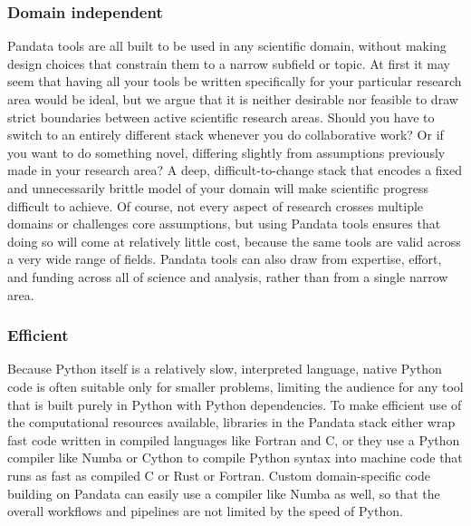 \subsubsection{Domain independent}
Pandata tools are all built to be used in any scientific domain, without making design choices that constrain them to a narrow subfield or topic. At first it may seem that having all your tools be written specifically for your particular research area would be ideal, but we argue that it is neither desirable nor feasible to draw strict boundaries between active scientific research areas. Should you have to switch to an entirely different stack whenever you do collaborative work? Or if you want to do something novel, differing slightly from assumptions previously made in your research area? A deep, difficult-to-change stack that encodes a fixed and unnecessarily brittle model of your domain will make scientific progress difficult to achieve. Of course, not every aspect of research crosses multiple domains or challenges core assumptions, but using Pandata tools ensures that doing so will come at relatively little cost, because the same tools are valid across a very wide range of fields. Pandata tools can also draw from expertise, effort, and funding across all of science and analysis, rather than from a single narrow area.

\subsubsection{Efficient}
Because Python itself is a relatively slow, interpreted language, native Python code is often suitable only for smaller problems, limiting the audience for any tool that is built purely in Python with Python dependencies. To make efficient use of the computational resources available, libraries in the Pandata stack either wrap fast code written in compiled languages like Fortran and C, or they use a Python compiler like Numba \cite{lam:llvm15} or Cython \cite{behnel:cse11} to compile Python syntax into machine code that runs as fast as compiled C or Rust or Fortran. Custom domain-specific code building on Pandata can easily use a compiler like Numba as well, so that the overall workflows and pipelines are not limited by the speed of Python.

